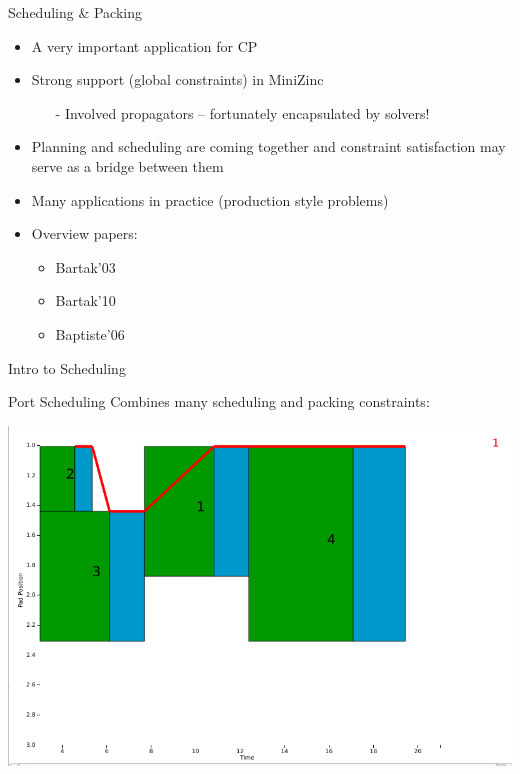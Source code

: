 \documentclass[handout,10pt,xcolor={dvipsnames},fleqn]{beamer}
\begin{document}
\begin{frame}{Scheduling \& Packing}
\begin{itemize}
\item A very important application for CP
\item Strong support (global constraints) in MiniZinc
\begin{itemize}
\item[-] Involved propagators -- fortunately encapsulated by solvers!
\end{itemize}
\vspace*{1ex}

\item Planning and scheduling are coming together and constraint
satisfaction may serve as a bridge between them
\item Many applications in practice (production style problems)

\vspace*{1ex}
\item Overview papers:
\begin{itemize}
\item Bartak'03~\cite{Bartak03constraintbasedscheduling}
\item Bartak'10~\cite{bartak2010constraint}
\item Baptiste'06~\cite{baptiste2006constraint}
\end{itemize}
\end{itemize}
\end{frame}

\begin{frame}[fragile]{Intro to Scheduling}

\end{frame}


 


\begin{frame}{Port Scheduling}
Combines many scheduling and packing constraints:
\begin{center}
\includegraphics[width=.7\textwidth]{img/portscheduling.png}
\end{center}
\end{frame}
\end{document}
